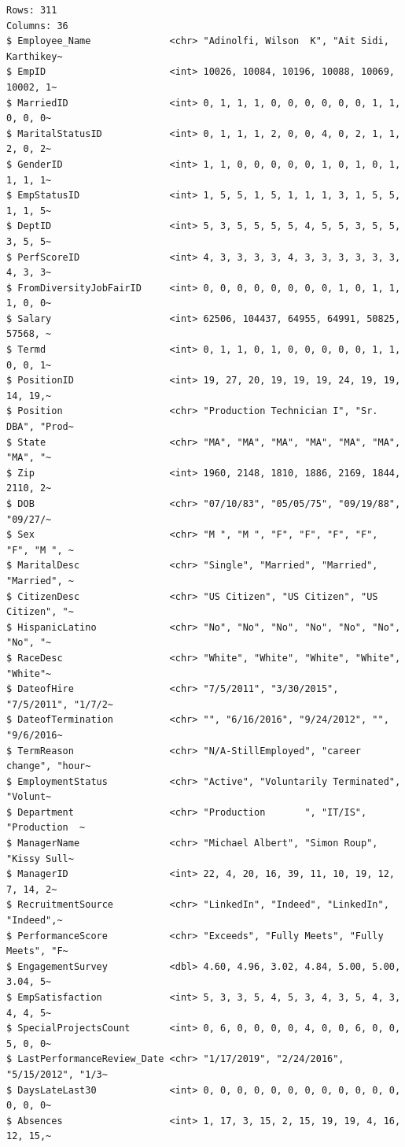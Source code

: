 \documentclass[
  letterpaper,
  DIV=11,
  numbers=noendperiod]{scrreprt}
\theoremstyle{definition}
\theoremstyle{remark}
\begin{document}
\begin{verbatim}
Rows: 311
Columns: 36
$ Employee_Name              <chr> "Adinolfi, Wilson  K", "Ait Sidi, Karthikey~
$ EmpID                      <int> 10026, 10084, 10196, 10088, 10069, 10002, 1~
$ MarriedID                  <int> 0, 1, 1, 1, 0, 0, 0, 0, 0, 0, 1, 1, 0, 0, 0~
$ MaritalStatusID            <int> 0, 1, 1, 1, 2, 0, 0, 4, 0, 2, 1, 1, 2, 0, 2~
$ GenderID                   <int> 1, 1, 0, 0, 0, 0, 0, 1, 0, 1, 0, 1, 1, 1, 1~
$ EmpStatusID                <int> 1, 5, 5, 1, 5, 1, 1, 1, 3, 1, 5, 5, 1, 1, 5~
$ DeptID                     <int> 5, 3, 5, 5, 5, 5, 4, 5, 5, 3, 5, 5, 3, 5, 5~
$ PerfScoreID                <int> 4, 3, 3, 3, 3, 4, 3, 3, 3, 3, 3, 3, 4, 3, 3~
$ FromDiversityJobFairID     <int> 0, 0, 0, 0, 0, 0, 0, 0, 1, 0, 1, 1, 1, 0, 0~
$ Salary                     <int> 62506, 104437, 64955, 64991, 50825, 57568, ~
$ Termd                      <int> 0, 1, 1, 0, 1, 0, 0, 0, 0, 0, 1, 1, 0, 0, 1~
$ PositionID                 <int> 19, 27, 20, 19, 19, 19, 24, 19, 19, 14, 19,~
$ Position                   <chr> "Production Technician I", "Sr. DBA", "Prod~
$ State                      <chr> "MA", "MA", "MA", "MA", "MA", "MA", "MA", "~
$ Zip                        <int> 1960, 2148, 1810, 1886, 2169, 1844, 2110, 2~
$ DOB                        <chr> "07/10/83", "05/05/75", "09/19/88", "09/27/~
$ Sex                        <chr> "M ", "M ", "F", "F", "F", "F", "F", "M ", ~
$ MaritalDesc                <chr> "Single", "Married", "Married", "Married", ~
$ CitizenDesc                <chr> "US Citizen", "US Citizen", "US Citizen", "~
$ HispanicLatino             <chr> "No", "No", "No", "No", "No", "No", "No", "~
$ RaceDesc                   <chr> "White", "White", "White", "White", "White"~
$ DateofHire                 <chr> "7/5/2011", "3/30/2015", "7/5/2011", "1/7/2~
$ DateofTermination          <chr> "", "6/16/2016", "9/24/2012", "", "9/6/2016~
$ TermReason                 <chr> "N/A-StillEmployed", "career change", "hour~
$ EmploymentStatus           <chr> "Active", "Voluntarily Terminated", "Volunt~
$ Department                 <chr> "Production       ", "IT/IS", "Production  ~
$ ManagerName                <chr> "Michael Albert", "Simon Roup", "Kissy Sull~
$ ManagerID                  <int> 22, 4, 20, 16, 39, 11, 10, 19, 12, 7, 14, 2~
$ RecruitmentSource          <chr> "LinkedIn", "Indeed", "LinkedIn", "Indeed",~
$ PerformanceScore           <chr> "Exceeds", "Fully Meets", "Fully Meets", "F~
$ EngagementSurvey           <dbl> 4.60, 4.96, 3.02, 4.84, 5.00, 5.00, 3.04, 5~
$ EmpSatisfaction            <int> 5, 3, 3, 5, 4, 5, 3, 4, 3, 5, 4, 3, 4, 4, 5~
$ SpecialProjectsCount       <int> 0, 6, 0, 0, 0, 0, 4, 0, 0, 6, 0, 0, 5, 0, 0~
$ LastPerformanceReview_Date <chr> "1/17/2019", "2/24/2016", "5/15/2012", "1/3~
$ DaysLateLast30             <int> 0, 0, 0, 0, 0, 0, 0, 0, 0, 0, 0, 0, 0, 0, 0~
$ Absences                   <int> 1, 17, 3, 15, 2, 15, 19, 19, 4, 16, 12, 15,~
\end{verbatim}
\end{document}
